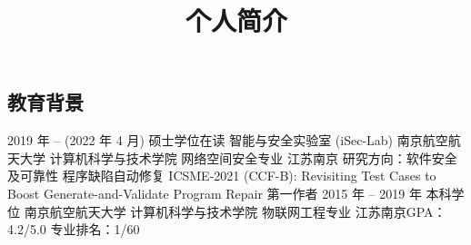 \documentclass[11pt,a4paper,sans]{moderncv}   %
\title{个人简介}                     %
\begin{document}
\begin{CJK}{UTF8}{gbsn}                       %
\maketitle

\section{教育背景}
\cventry
{2019 年 -- (2022 年 4 月)}
{硕士学位在读 智能与安全实验室 (iSec-Lab)}
{南京航空航天大学 计算机科学与技术学院 网络空间安全专业}
{江苏南京}{}{
  研究方向：软件安全及可靠性 程序缺陷自动修复 \newline{}
  ICSME-2021 (CCF-B): Revisiting Test Cases to Boost Generate-and-Validate Program Repair 第一作者 \newline{}
}  %
\cventry
{2015 年 -- 2019 年}
{本科学位}
{南京航空航天大学 计算机科学与技术学院 物联网工程专业}
{江苏南京}{}{GPA：4.2/5.0 专业排名：1/60}




\end{CJK}
\end{document}

